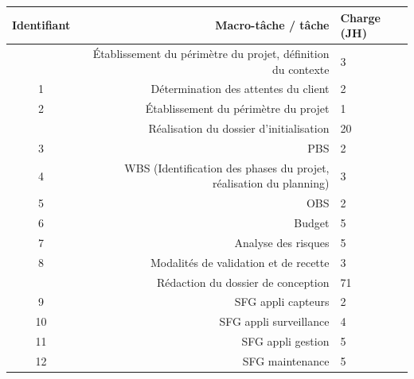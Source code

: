 \documentclass[a4paper]{article}
\begin{document}
%
\begin{table}[!htp]\centering

\begin{tabular}{|cr|l|}\toprule 
Identifiant &Macro-tâche / tâche &Charge (JH) \\\midrule
\cellcolor[HTML]{ff9900} &\cellcolor[HTML]{f6b26b}Établissement du périmètre du projet, définition du contexte &\cellcolor[HTML]{f6b26b}3 \\\hline
\cellcolor[HTML]{f9cb9c} 1&Détermination des attentes du client &2 \\\hline
\cellcolor[HTML]{f9cb9c} 2&Établissement du périmètre du projet &1 \\\hline
\cellcolor[HTML]{ff9900} &\cellcolor[HTML]{f6b26b}Réalisation du dossier d’initialisation &\cellcolor[HTML]{f6b26b}20 \\\hline
\cellcolor[HTML]{f9cb9c} 3&PBS &2 \\\hline
\cellcolor[HTML]{f9cb9c} 4&WBS (Identification des phases du projet, réalisation du planning) &3 \\\hline
\cellcolor[HTML]{f9cb9c} 5&OBS &2 \\\hline
\cellcolor[HTML]{f9cb9c} 6&Budget &5 \\\hline
\cellcolor[HTML]{f9cb9c} 7&Analyse des risques &5 \\\hline
\cellcolor[HTML]{f9cb9c} 8&Modalités de validation et de recette &3 \\\hline
\cellcolor[HTML]{ff9900} &\cellcolor[HTML]{f6b26b}Rédaction du dossier de conception &\cellcolor[HTML]{f6b26b}71 \\\hline
\cellcolor[HTML]{f9cb9c} 9&SFG appli capteurs &2 \\\hline
\cellcolor[HTML]{f9cb9c} 10&SFG appli surveillance &4 \\\hline
\cellcolor[HTML]{f9cb9c} 11&SFG appli gestion &5 \\\hline
\cellcolor[HTML]{f9cb9c} 12&SFG maintenance &5 \\\hline

\end{tabular}
\end{table}
\end{document}
